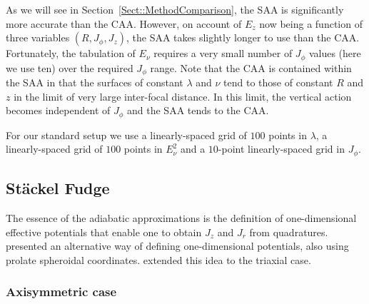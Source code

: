 \documentclass[useAMS,usenatbib,fleqn,a4paper]{mn2e}
\begin{document}
As we will see in Section~\ref{Sect::MethodComparison}, the SAA is
significantly more accurate than the CAA. However, on account of $E_z$ now
being a function of three variables $(R,J_\phi,J_z)$, the SAA takes slightly
longer to use than the CAA. Fortunately, the tabulation of $E_\nu$ requires a very
small number of $J_\phi$ values (here we use ten) over the required $J_\phi$
range. Note that the CAA is contained within the SAA in that the surfaces of
constant $\lambda$ and $\nu$ tend to those of constant $R$ and $z$ in the
limit of very large inter-focal distance. In this limit, the vertical action
becomes independent of $J_\phi$ and the SAA tends to the CAA.

For our standard setup we use a linearly-spaced grid of $100$ points in $\lambda$, a linearly-spaced grid of $100$ points in $E_\nu^2$ and a $10$-point linearly-spaced grid in $J_\phi$.

\subsection{St\"ackel Fudge}\label{Method::SF}

The essence of the adiabatic approximations is the definition of
one-dimensional effective potentials that enable one to obtain $J_z$ and
$J_r$ from quadratures.  \cite{Binney2012} presented an alternative way of
defining one-dimensional potentials, also using prolate spheroidal
coordinates. \cite{SandersBinney2015} extended this idea  to the triaxial
case.

\subsubsection{Axisymmetric case}\label{Method::SF_Axi}
\end{document}
